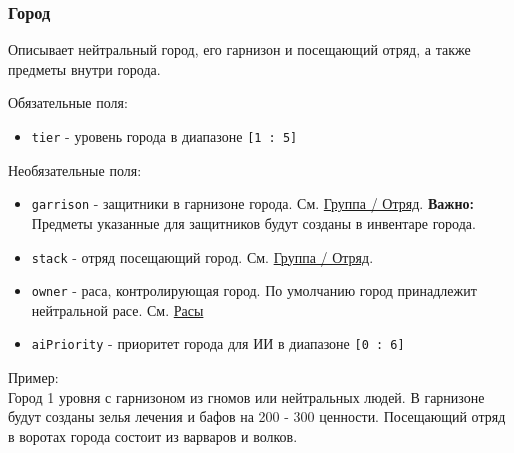 \subsubsection{Город}
\label{city}
Описывает нейтральный город, его гарнизон и посещающий отряд, а также предметы внутри города.

Обязательные поля:
\begin{itemize}
\item \texttt{tier} - уровень города в диапазоне \texttt{[1 : 5]}
\end{itemize}

Необязательные поля:
\begin{itemize}
\item \texttt{garrison} - защитники в гарнизоне города. См. \hyperref[group]{Группа / Отряд}. \textbf{Важно:} Предметы указанные для защитников будут созданы в инвентаре города.
\item \texttt{stack} - отряд посещающий город. См. \hyperref[group]{Группа / Отряд}.
\item \texttt{owner} - раса, контролирующая город. По умолчанию город принадлежит нейтральной расе. См. \hyperref[raceTypes]{Расы}
\item \texttt{aiPriority} - приоритет города для ИИ в диапазоне \texttt{[0 : 6]}
\end{itemize}

Пример:\\
Город 1 уровня с гарнизоном из гномов или нейтральных людей.
В гарнизоне будут созданы зелья лечения и бафов на 200 - 300 ценности.
Посещающий отряд в воротах города состоит из варваров и волков.

\begin{figure}[H]

\end{figure}